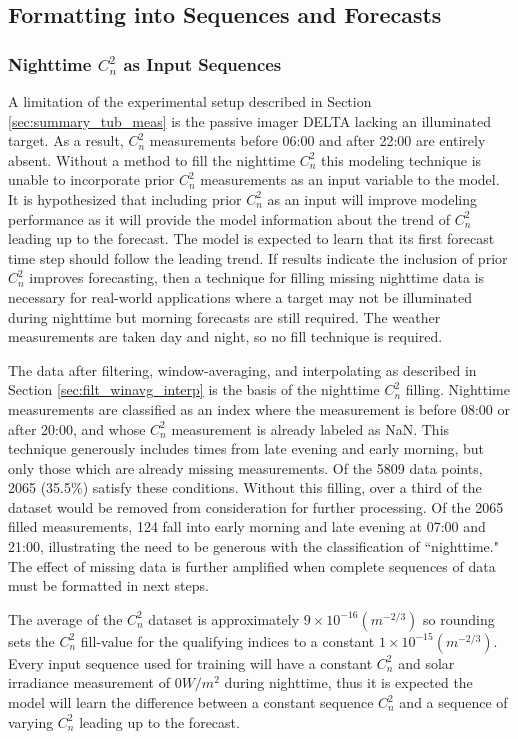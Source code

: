 \subsection{Formatting into Sequences and Forecasts}
\label{sec:format_sequence_forecast}
\subsubsection{Nighttime $C_{n}^{2}$ as Input Sequences}
A limitation of the experimental setup described in Section \ref{sec:summary_tub_meas} is the passive imager DELTA lacking an illuminated target. As a result, $C_{n}^{2}$ measurements before 06:00 and after 22:00 are entirely absent. Without a method to fill the nighttime $C_{n}^{2}$ this modeling technique is unable to incorporate prior $C_{n}^{2}$ measurements as an input variable to the model. It is hypothesized that including prior $C_{n}^{2}$ as an input will improve modeling performance as it will provide the model information about the trend of $C_{n}^{2}$ leading up to the forecast. The model is expected to learn that its first forecast time step should follow the leading trend. If results indicate the inclusion of prior $C_{n}^{2}$ improves forecasting, then a technique for filling missing nighttime data is necessary for real-world applications where a target may not be illuminated during nighttime but morning forecasts are still required. The weather measurements are taken day and night, so no fill technique is required.

The data after filtering, window-averaging, and interpolating as described in Section \ref{sec:filt_winavg_interp} is the basis of the nighttime $C_{n}^{2}$ filling. Nighttime measurements are classified as an index where the measurement is before 08:00 or after 20:00, and whose $C_{n}^{2}$ measurement is already labeled as \ac{NaN}. This technique generously includes times from late evening and early morning, but only those which are already missing measurements. Of the 5809 data points, 2065 (35.5\%) satisfy these conditions. Without this filling, over a third of the dataset would be removed from consideration for further processing. Of the 2065 filled measurements, 124 fall into early morning and late evening at 07:00 and 21:00, illustrating the need to be generous with the classification of ``nighttime." The effect of missing data is further amplified when complete sequences of data must be formatted in next steps.

The average of the $C_{n}^{2}$ dataset is approximately $9 \times 10^{-16} (m^{-2/3})$ so rounding sets the $C_{n}^{2}$ fill-value for the qualifying indices to a constant $1 \times 10^{-15} (m^{-2/3})$. Every input sequence used for training will have a constant $C_{n}^{2}$ and solar irradiance measurement of $0 W/m^{2}$ during nighttime, thus it is expected the model will learn the difference between a constant sequence $C_{n}^{2}$ and a sequence of varying $C_{n}^{2}$ leading up to the forecast.


